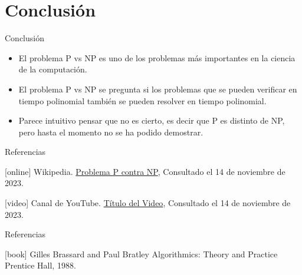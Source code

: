 \documentclass[dvipsnames, 11pt]{beamer}
\theoremstyle{plain}
\theoremstyle{definition}
\begin{document}
\section{Conclusión}
\begin{frame}{Conclusión}
    \begin{itemize}
        \item El problema P vs NP es uno de los problemas más importantes en la ciencia de la computación.\pause
        \item El problema P vs NP se pregunta si los problemas que se pueden verificar en tiempo polinomial también se pueden resolver en tiempo polinomial.\pause
        \item Parece intuitivo pensar que no es cierto, es decir que P es distinto de NP, pero hasta el momento no se ha podido demostrar.
    \end{itemize}
\end{frame}
\begin{frame}{Referencias}
    \begin{thebibliography}{10}
    [online]
    Wikipedia.
    \newblock \href{https://es.wikipedia.org/wiki/Problema_P_contra_NP}{Problema P contra NP},
    \newblock Consultado el 14 de noviembre de 2023.

    [video]
    Canal de YouTube.
    \newblock \href{https://www.youtube.com/watch?v=UR2oDYZ-Sao}{Título del Video},
    \newblock Consultado el 14 de noviembre de 2023.
    
    \end{thebibliography}
\end{frame}

\begin{frame}{Referencias}
    \begin{thebibliography}{10}


        [book]
        Gilles Brassard and Paul Bratley
        \newblock Algorithmics: Theory and Practice
        \newblock Prentice Hall, 1988.
    
        \end{thebibliography}
\end{frame}
\end{document}
